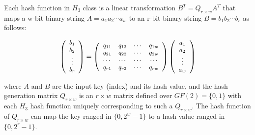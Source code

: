 \documentclass[10pt,journal,letterpaper]{IEEEtran}
\begin{document}
Each hash function in $H_3$ class is a linear transformation ${B^T} = {Q_{r \times w}}{A^T}$ that maps a w-bit binary string $A = {a_1}{a_2} \cdots {a_w}$ to an r-bit binary string $B = {b_1}{b_2} \cdots {b_r}$ as follows:

\begin{equation}
\footnotesize
\left( {\begin{array}{*{20}{c}}
   {{b_1}}  \\
   {{b_2}}  \\
    \vdots   \\
   {{b_r}}  \\
\end{array}} \right) = \left( {\begin{array}{*{20}{c}}
   {{q_{11}}} & {{q_{12}}} &  \cdots  & {{q_{1w}}}  \\
   {{q_{21}}} & {{q_{22}}} &  \cdots  & {{q_{2w}}}  \\
    \cdots  &  \cdots  &  \cdots  &  \cdots   \\
   {{q_{r1}}} & {{q_{r2}}} &  \cdots  & {{q_{rw}}}  \\
\end{array}} \right)\left( {\begin{array}{*{20}{c}}
   {{a_1}}  \\
   {{a_2}}  \\
    \vdots   \\
   {{a_w}}  \\
\end{array}} \right)
\label{eq:h3hash}
\end{equation}

\noindent where $A$ and $B$ are the input key (index) and its hash value, and the hash generation matrix ${Q_{r \times w}}$ is an $r \times w$ matrix defined over $GF(2)=\{0,1\}$ with each $H_3$ hash function uniquely corresponding to such a ${Q_{r \times w}}$. The hash function of ${Q_{r \times w}}$ can map the key ranged in $\{0,{2^w} - 1\}$ to a hash value ranged in $\{0,{2^r} - 1\}$.
\end{document}
